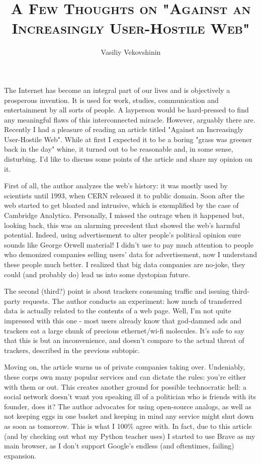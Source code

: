 \documentclass[12pt]{article}
\title{\textsc{A Few Thoughts on "Against an Increasingly User-Hostile Web"}}
\date{\vspace{-5ex}}
\author{Vasiliy Vekovshinin}
\begin{document}
\maketitle
The Internet has become an integral part of our lives and is objectively a prosperous invention. It is used for work, studies, communication and entertainment by all sorts of people. A layperson would be hard-pressed to find any meaningful flaws of this interconnected miracle. However, arguably there are.  Recently I had a pleasure of reading an article titled "Against an Increasingly User-Hostile Web". While at first I expected it to be a boring "grass was greener back in the day" whine, it turned out to be reasonable and, in some sense, disturbing. I'd like to discuss some points of the article and share my opinion on it.
\newline

First of all, the author analyzes the web's history: it was mostly used by scientists until 1993, when CERN released it to public domain. Soon after the web started to get bloated and intrusive, which is exemplified by the case of Cambridge Analytica. Personally, I missed the outrage when it happened but, looking back, this was an alarming precedent that showed the web's harmful potential. Indeed, using advertisement to alter people's political opinion sure sounds like George Orwell material! I didn't use to pay much attention to people who demonized companies selling users' data for advertisement, now I understand these people much better. I realized that big data companies are no-joke, they could (and probably do) lead us into some dystopian future. 
\newline

The second (third?) point is about trackers consuming traffic and issuing third-party requests. The author conducts an experiment: how much of transferred data is actually related to the contents of a web page. Well, I'm not quite impressed with this one - most users already know that god-damned ads and trackers eat a large chunk of precious ethernet/wi-fi molecules. It's safe to say that this is but an inconvenience, and doesn't compare to the actual threat of trackers, described in the previous subtopic.
\newline

Moving on, the article warns us of private companies taking over. Undeniably, these corps own many popular services and can dictate the rules: you're either with them or out. This creates another ground for possible  technocratic hell: a social network doesn't want you speaking ill of a politician who is friends with its founder, does it? The author advocates for using open-source analogs, as well as not keeping eggs in one basket and keeping in mind any service might shut down as soon as tomorrow. This is what I 100\% agree with. In fact, due to this article (and by checking out what my Python teacher uses) I started to use Brave as my main browser, as I don't support Google's endless (and oftentimes, failing) expansion.
\newline
\end{document}
